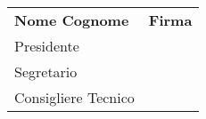 \vspace{1cm}

\begin{tabular}{p{4cm} p{2cm}}
\textbf{Nome Cognome} & \textbf{Firma} \\[2em]
Presidente & \vspace{2.5cm}\hrulefill \\[2.5cm]
Segretario & \vspace{2.5cm}\hrulefill \\[2.5cm]
Consigliere Tecnico & \vspace{2.5cm}\hrulefill \\
\end{tabular}
